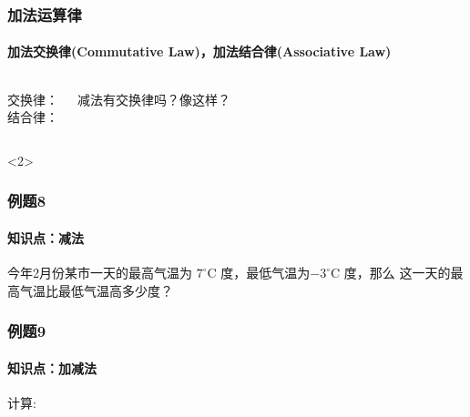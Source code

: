 \begin{frame}
    \frametitle{加法运算律}
    \framesubtitle{加法交换律(Commutative Law)，加法结合律(Associative Law)}
    \begin{columns}
        \begin{theorem}
            交换律：\\
            结合律：
        \end{theorem}
        
        减法有交换律吗？像这样？
    \end{columns}
    \begin{alertblock}<2>{}
        \centering
    \end{alertblock}
    
\end{frame}

\begin{frame}
    \frametitle{例题8}
    \framesubtitle{知识点：减法}
    \begin{block}{}
        今年2月份某市一天的最高气温为 $7^{\circ}$C 度，最低气温为$-3^{\circ}$C 度，那么
        这一天的最高气温比最低气温高多少度？
    \end{block}
\end{frame}

\begin{frame}
    \frametitle{例题9}
    \framesubtitle{知识点：加减法}
    \begin{block}{}
        计算: 
    \end{block}

\end{frame}

